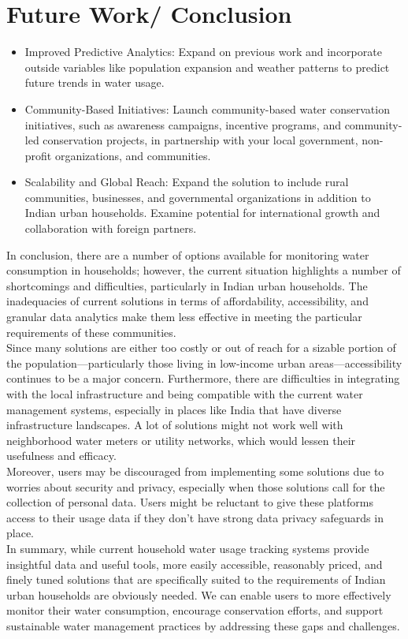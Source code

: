 \section{Future Work/ Conclusion}
\begin{itemize}
	\item Improved Predictive Analytics: Expand on previous work and incorporate outside variables like population expansion and weather patterns to predict future trends in water usage.
	\item Community-Based Initiatives: Launch community-based water conservation initiatives, such as awareness campaigns, incentive programs, and community-led conservation projects, in partnership with your local government, non-profit organizations, and communities.
	\item Scalability and Global Reach: Expand the solution to include rural communities, businesses, and governmental organizations in addition to Indian urban households. Examine potential for international growth and collaboration with foreign partners.
\end{itemize}
In conclusion, there are a number of options available for monitoring water consumption in households; however, the current situation highlights a number of shortcomings and difficulties, particularly in Indian urban households. The inadequacies of current solutions in terms of affordability, accessibility, and granular data analytics make them less effective in meeting the particular requirements of these communities.\\
Since many solutions are either too costly or out of reach for a sizable portion of the population—particularly those living in low-income urban areas—accessibility continues to be a major concern. 
Furthermore, there are difficulties in integrating with the local infrastructure and being compatible with the current water management systems, especially in places like India that have diverse infrastructure landscapes. A lot of solutions might not work well with neighborhood water meters or utility networks, which would lessen their usefulness and efficacy.\\
Moreover, users may be discouraged from implementing some solutions due to worries about security and privacy, especially when those solutions call for the collection of personal data. Users might be reluctant to give these platforms access to their usage data if they don't have strong data privacy safeguards in place.\\
In summary, while current household water usage tracking systems provide insightful data and useful tools, more easily accessible, reasonably priced, and finely tuned solutions that are specifically suited to the requirements of Indian urban households are obviously needed. We can enable users to more effectively monitor their water consumption, encourage conservation efforts, and support sustainable water management practices by addressing these gaps and challenges.
